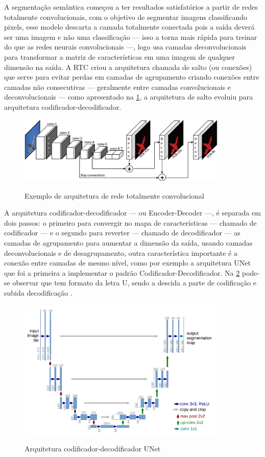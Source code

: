A segmentação semântica começou a ter resultados satisfatórios a partir de redes totalmente convolucionais, com o objetivo de segmentar imagens classificando pixels, esse modelo descarta a camada totalmente conectada pois a saída deverá ser uma imagem e não uma classificação — isso a torna mais rápida para treinar do que as redes neurais convolucionais —, logo usa camadas deconvolucionais para transformar a matriz de características em uma imagem de qualquer dimensão na saída. A RTC criou a arquitetura chamada de salto (ou conexões) que serve para evitar perdas em camadas de agrupamento criando conexões entre camadas não consecutivas — geralmente entre camadas convolucionais e deconvolucionais — como apresentado na \cref{fig:rtc}, a arquitetura de salto evoluiu para arquitetura codificador-decodificador.
\begin{figure}[H]
	\caption{Exemplo de arquitetura de rede totalmente convolucional}
	\centering %
	\includegraphics[width=10cm]{figures/redes_totalmente_convolucionais.jpeg} %
	\label{fig:rtc}
\end{figure}

A arquitetura codificador-decodificador — ou Encoder-Decoder —, é separada em dois passos: o primeiro para convergir no mapa de características — chamado de codificador — e o segundo para reverter — chamado de decodificador — as camadas de agrupamento para aumentar a dimensão da saída, usando camadas deconvolucionais e de desagrupamento, outra característica importante é a conexão entre camadas de mesmo nível, como por exemplo a arquitetura UNet que foi a primeira a implementar o padrão Codificador-Decodificador. Na \cref{fig:unet} pode-se observar que tem formato da letra U, sendo a descida a parte de codificação e subida decodificação \cite{dp_semantic_segmantation, lapix, unetArq}.

\begin{figure}[H]
	\caption{Arquitetura codificador-decodificador UNet}
	\centering %
	\includegraphics[width=10cm]{figures/unet.png} %
	\label{fig:unet}
\end{figure}


